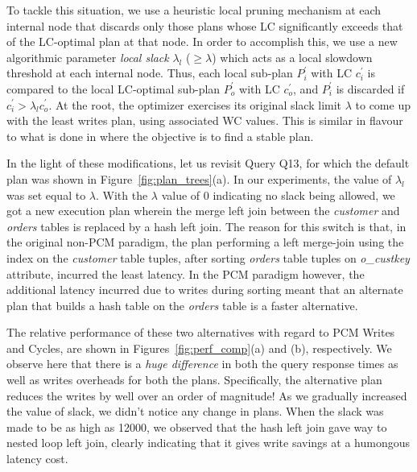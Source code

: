 To tackle this situation, we use a heuristic local pruning mechanism at each internal node that discards only those plans whose LC significantly exceeds that of the LC-optimal plan at that node. In order to accomplish this, we use a new algorithmic parameter \emph{local slack} $\lambda_l$ ($\ge\lambda$) which acts as a local slowdown threshold at each internal node. Thus, each local sub-plan $P_i^'$ with LC $c_i^'$ is compared to the local LC-optimal sub-plan $P_o^'$ with LC $c_o^'$, and $P_i^'$ is discarded if $c_i^{'} > \lambda_l c_o^'$. At the root, the optimizer exercises its original slack limit $\lambda$ to come up with the least writes plan, using associated WC values. This is similar in flavour to what is done in \cite{expand} where the objective is to find a stable plan.  

In the light of these modifications, let
us revisit Query Q13, for which the default plan was shown in
Figure~\ref{fig:plan_trees}(a). In our experiments, the value of $\lambda_l$ was set equal to $\lambda$. With the $\lambda$ value of 0 indicating no slack being allowed, we got a new execution plan wherein the
merge left join between the \textit{customer} and \textit{orders}
tables is replaced by a hash left join. The reason for this switch is that, in the original non-PCM paradigm, the plan performing a left merge-join using the index on the \textit{customer} table tuples, after sorting \textit{orders} table tuples on \textit{o\_custkey} attribute, incurred the least latency. In the PCM paradigm however, the additional latency incurred due to writes during sorting meant that an alternate plan that builds a hash table on the \textit{orders} table is a faster alternative. 

The relative performance of
these two alternatives with regard to PCM Writes and Cycles, are shown
in Figures~\ref{fig:perf_comp}(a) and (b), respectively. We observe
here that there is a \emph{huge difference} in both the query response times as well as writes overheads for both the plans.
Specifically, the alternative plan reduces the writes by well over an
order of magnitude!
As we gradually increased the value of slack, we didn't notice any change in plans. When the slack was made to be as high as 12000, we observed that the hash left join gave way to nested loop left join, clearly indicating that  it gives write savings at a humongous latency cost.


